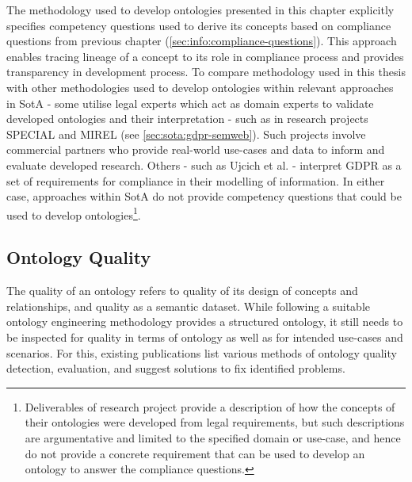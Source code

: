 The methodology used to develop ontologies presented in this chapter explicitly specifies competency questions used to derive its concepts based on compliance questions from previous chapter (\autoref{sec:info:compliance-questions}). This approach enables tracing lineage of a concept to its role in compliance process and provides transparency in development process.
To compare methodology used in this thesis with other methodologies used to develop ontologies within relevant approaches in SotA - some utilise legal experts which act as domain experts to validate developed ontologies and their interpretation - such as in research projects SPECIAL and MIREL (see \autoref{sec:sota:gdpr-semweb}). Such projects involve commercial partners who provide real-world use-cases and data to inform and evaluate developed research.
Others - such as Ujcich et al. \cite{belhajjame_provenance_2018} - interpret GDPR as a set of requirements for compliance in their modelling of information. In either case, approaches within SotA do not provide competency questions that could be used to develop ontologies\footnote{Deliverables of research project provide a description of how the concepts of their ontologies were developed from legal requirements, but such descriptions are argumentative and limited to the specified domain or use-case, and hence do not provide a concrete requirement that can be used to develop an ontology to answer the compliance questions.}.


\subsection{Ontology Quality}
The quality of an ontology refers to quality of its design of concepts and relationships, and quality as a semantic dataset. While following a suitable ontology engineering methodology provides a structured ontology, it still needs to be inspected for quality in terms of ontology as well as for intended use-cases and scenarios. For this, existing publications \cite{gurk_towards_2017,vrandecic_ontology_2010} list various methods of ontology quality detection, evaluation, and suggest solutions to fix identified problems.

